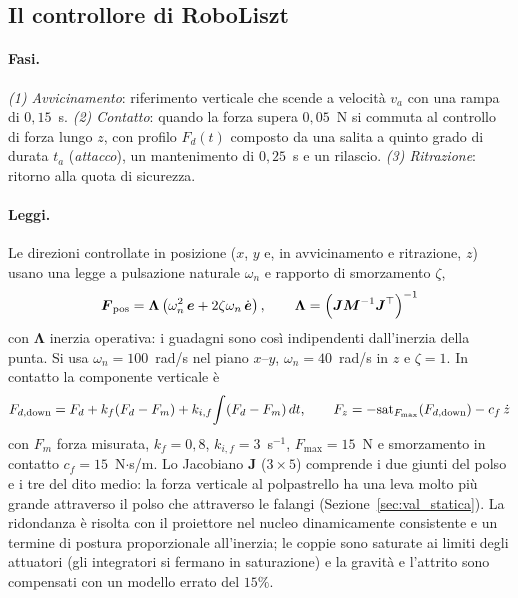 \subsection{Il controllore di RoboLiszt}

\paragraph{Fasi.} \emph{(1) Avvicinamento}: riferimento verticale che scende a velocità $v_a$ con una rampa di $0{,}15$~s. \emph{(2) Contatto}: quando la forza supera $0{,}05$~N si commuta al controllo di forza lungo $z$, con profilo $F_d(t)$ composto da una salita a quinto grado di durata $t_a$ (\emph{attacco}), un mantenimento di $0{,}25$~s e un rilascio. \emph{(3) Ritrazione}: ritorno alla quota di sicurezza.

\paragraph{Leggi.} Le direzioni controllate in posizione ($x$, $y$ e, in avvicinamento e ritrazione, $z$) usano una legge a pulsazione naturale $\omega_n$ e rapporto di smorzamento $\zeta$,
\begin{equation}
    \boldsymbol F_{\rm pos}=\boldsymbol\Lambda\left(\omega_n^2\,\boldsymbol e+2\zeta\omega_n\,\dot{\boldsymbol e}\right),\qquad \boldsymbol\Lambda=\left(\boldsymbol J\boldsymbol M^{-1}\boldsymbol J^\top\right)^{-1}
\end{equation}
con $\boldsymbol\Lambda$ inerzia operativa: i guadagni sono così indipendenti dall'inerzia della punta. Si usa $\omega_n=100$~rad/s nel piano $x$--$y$, $\omega_n=40$~rad/s in $z$ e $\zeta=1$. In contatto la componente verticale è
\begin{equation}
    F_{d,\rm down}=F_d+k_f(F_d-F_m)+k_{i,f}\!\int(F_d-F_m)\,dt,\qquad F_z=-\mathrm{sat}_{F_{\max}}(F_{d,\rm down})-c_f\,\dot z
\end{equation}
con $F_m$ forza misurata, $k_f=0{,}8$, $k_{i,f}=3$~s$^{-1}$, $F_{\max}=15$~N e smorzamento in contatto $c_f=15$~N$\cdot$s/m. Lo Jacobiano $\boldsymbol J$ ($3\times5$) comprende i due giunti del polso e i tre del dito medio: la forza verticale al polpastrello ha una leva molto più grande attraverso il polso che attraverso le falangi (Sezione~\ref{sec:val_statica}). La ridondanza è risolta con il proiettore nel nucleo dinamicamente consistente e un termine di postura proporzionale all'inerzia; le coppie sono saturate ai limiti degli attuatori (gli integratori si fermano in saturazione) e la gravità e l'attrito sono compensati con un modello errato del $15\%$.


